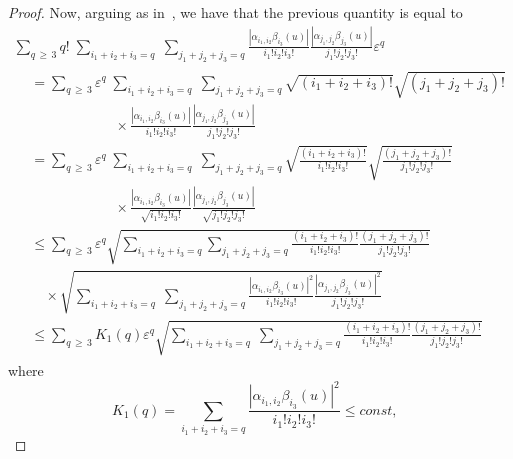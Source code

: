 \documentclass[AHL,Unicode,longabstracts,published]{cedram}
\begin{document}
\begin{proof}
\endgroup
Now, arguing as in~\cite[Section~6.2.2]{DNPR:16}, we have that the previous quantity is equal to
\begingroup
\allowdisplaybreaks
\begin{multline*}
\sum_{q\,\geq\,3}q!\;\sum_{i_{1}+i_{2}+i_{3}=q}\;\sum_{j_{1}+j_{2}+j_{3}=q}\frac{\left|\alpha _{i_{1},i_{2}}\beta _{i_{3}}(u)\right|}{i_{1}!i_{2}!i_{3}!}\frac{\left|\alpha _{j_{1},j_{2}}\beta _{j_{3}}(u)\right|}{j_{1}!j_{2}!j_{3}!}\varepsilon^{q} \\
\begin{aligned}
&=\sum_{q\,\geq\,3}\varepsilon^{q}\;\sum_{i_{1}+i_{2}+i_{3}=q}\;\sum_{j_{1}+j_{2}+j_{3}=q}\sqrt{\left(i_{1}+i_{2}+i_{3}\right)!}\sqrt{\left(j_{1}+j_{2}+j_{3}\right)!} \\
&\qquad\qquad\qquad\times \frac{\left|\alpha_{i_{1},i_{2}}\beta_{i_{3}}(u)\right|}{i_{1}!i_{2}!i_{3}!}\frac{\left|\alpha_{j_{1},j_{2}}\beta_{j_{3}}(u)\right|}{j_{1}!j_{2}!j_{3}!} \\
&=\sum_{q\,\geq\,3}\varepsilon^{q}\;\sum_{i_{1}+i_{2}+i_{3}=q}\;\sum_{j_{1}+j_{2}+j_{3}=q}\sqrt{\frac{\left(i_{1}+i_{2}+i_{3}\right)!}{i_{1}!i_{2}!i_{3}!}}\sqrt{\frac{\left(j_{1}+j_{2}+j_{3}\right)!}{j_{1}!j_{2}!j_{3}!}} \\
&\qquad\qquad\qquad\times\frac{\left|\alpha _{i_{1},i_{2}}\beta _{i_{3}}(u)\right|}{\sqrt{i_{1}!i_{2}!i_{3}!}}\frac{\left|\alpha _{j_{1},j_{2}}\beta _{j_{3}}(u)\right|}{
\sqrt{j_{1}!j_{2}!j_{3}!}} \\
&\leq \sum_{q\,\geq\,3}\varepsilon^{q}\sqrt{\sum_{i_{1}+i_{2}+i_{3}=q}
\sum_{j_{1}+j_{2}+j_{3}=q}\frac{\left(i_{1}+i_{2}+i_{3}\right)!}{i_{1}!i_{2}!i_{3}!}
\frac{\left(j_{1}+j_{2}+j_{3}\right)!}{j_{1}!j_{2}!j_{3}!}} \\
&\quad \times \sqrt{\sum_{i_{1}+i_{2}+i_{3}=q}\;\sum_{j_{1}+j_{2}+j_{3}=q}
\frac{\left|\alpha _{i_{1},i_{2}}\beta _{i_{3}}(u)\right|^{2}}{i_{1}!i_{2}!i_{3}!}\frac{\left|\alpha _{j_{1},j_{2}}\beta_{j_{3}}(u)\right|^{2}}{j_{1}!j_{2}!j_{3}!}} \\
&\leq \sum_{q\,\geq\,3}K_{1}(q)\varepsilon ^{q}\sqrt{
\sum_{i_{1}+i_{2}+i_{3}=q}\;\sum_{j_{1}+j_{2}+j_{3}=q}\frac{\left(i_{1}+i_{2}+i_{3}\right)!}{i_{1}!i_{2}!i_{3}!}\frac{\left(j_{1}+j_{2}+j_{3}\right)!}{j_{1}!j_{2}!j_{3}!}}
\end{aligned}
\end{multline*}
\endgroup
where
\begin{equation*}
K_{1}(q)=\sum_{i_{1}+i_{2}+i_{3}=q}\frac{\left|\alpha _{i_{1},i_{2}}\beta _{i_{3}}(u)\right|^{2}}{i_{1}!i_{2}!i_{3}!}\leq const,\text{ }
\end{equation*}

\end{proof}
\end{document}
